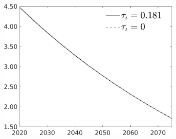 \begin{figure}[h!!]
\begin{subfigure}{0.9\textwidth}
\begin{minipage}[]{0.32\textwidth}
\end{minipage}
\begin{minipage}[]{0.32\textwidth}
\includegraphics[width=1\textwidth]{../../codding_model/own_basedOnFried/optimalPol_010922_revision/figures/all_13Sept22/PerdifNoTauf_regime0_CompTaul_sn_spillover0_nsk0_xgr0_knspil1_sep0_LFlimit0_emsbase0_countec0_GovRev0_etaa0.79_lgd1.png}
\end{minipage}
	\end{subfigure}
		

\end{figure}
